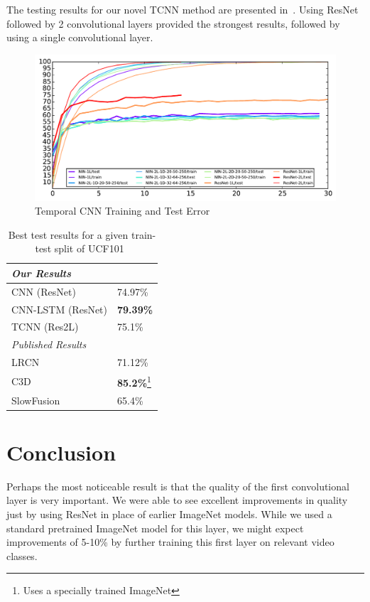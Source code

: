 The testing results for our novel TCNN method are presented in~. Using ResNet followed by 2 convolutional layers provided the strongest results, followed by using a single convolutional layer. 
\begin{figure}
  \centering
  \includegraphics[width=1.0\linewidth]{figs/TCNNout}
  \caption{Temporal CNN Training and Test Error}
  \label{fig:tnntest}
\end{figure}

\begin{table}[h!]
 \caption{Best test results for a given train-test split of UCF101~\cite{ucf101}}
\centering
 \begin{tabular}{||l l||}
 \hline
 \textit{Our Results} & \\ \hline
 CNN (ResNet) & 74.97\% \\
 CNN-LSTM (ResNet) & \textbf{79.39\%} \\
 TCNN (Res2L) & 75.1\% \\ \hline
 \textit{Published Results} & \\ \hline
 LRCN~\cite{byeon2015scene} & 71.12\% \\
 C3D~\cite{stf} & \textbf{85.2\%}\footnote{Uses a specially trained ImageNet} \\
 SlowFusion~\cite{cnnvid} & 65.4\%\\ [0.5ex]
 \hline
 \end{tabular}
\end{table}

\section{Conclusion}
Perhaps the most noticeable result is that the quality of the first convolutional layer is very important. We were able to see excellent improvements in quality just by using ResNet in place of earlier ImageNet models. While we used a standard pretrained ImageNet model for this layer, we might expect improvements of 5-10\% by further training this first layer on relevant video classes. 

